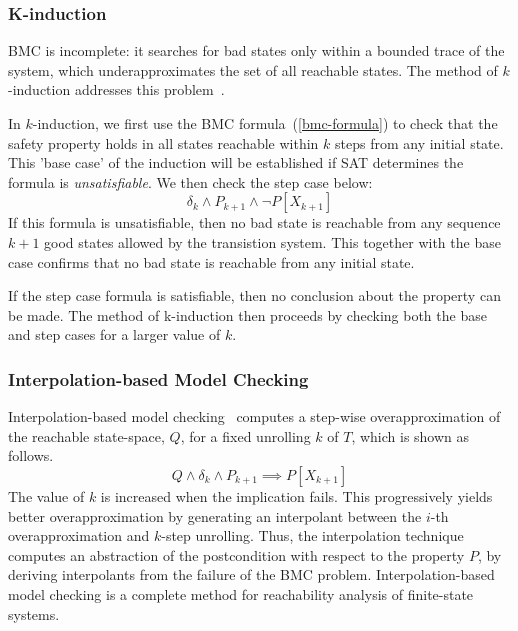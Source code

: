 \subsubsection{K-induction} 

BMC is incomplete: it searches for bad states only within a bounded trace of the system, 
which underapproximates the set of  all reachable states.  The method of 
$k$-induction addresses this problem~\cite{fmcad2000}.
  
In $k$-induction, we first use the BMC formula~(\ref{bmc-formula}) to check that the safety property
holds in all states reachable within $k$ steps from any initial state. This 'base case' of the induction will be established if SAT determines the formula is \textit{unsatisfiable}. We then check the step case below: 
%
\[\delta_{k} \wedge P_{k+1} \wedge \neg P[X_{k+1}] \]
%
If this formula is unsatisfiable, then no bad state is reachable from any sequence $k{+}1$ good states
allowed by the transistion system. This together with the base case confirms that no bad state is reachable from any initial state.

If the step case formula is satisfiable, then no conclusion about the property can be made. The method of k-induction then proceeds by checking both the base and step cases for a larger value of $k$. 

\subsubsection{Interpolation-based Model Checking} 
%
Interpolation-based model checking~\cite{cav03} 
computes a step-wise overapproximation of the reachable state-space,
$Q$, for a fixed unrolling $k$ of $T$, which is shown as
follows.
%
\[ Q \wedge \delta_{k} \wedge P_{k+1} \implies P[X_{k+1}] \]
%
The value of $k$ is increased when the implication fails. This
progressively yields better overapproximation by 
generating an interpolant between the $i$-th 
overapproximation and $k$-step unrolling.
Thus, the interpolation technique computes an abstraction 
of the postcondition with respect to the property $P$, 
by deriving interpolants from the failure of the
BMC problem.
%
Interpolation-based model checking is a complete method 
for reachability analysis of finite-state systems. 
%

